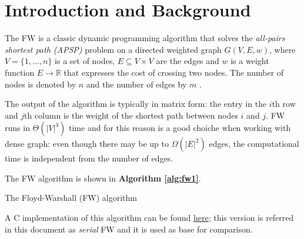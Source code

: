 \section{Introduction and Background}
The FW is a classic dynamic programming algorithm that solves the \emph{all-pairs shortest path (APSP)} problem on a directed weighted
graph $G(V, E, w)$, where $V = \{1, \dots, n\}$ is a set of nodes, $E \subseteq V \times V$ are the edges and $w$ is a weight function $E \rightarrow  \mathbb{R}$
that expresses the cost of crossing two nodes. The number of nodes is denoted by $n$ and the number of edges by $m$ . \par
The output of the algorithm is typically in matrix form: the entry in the $i$th row and $j$th column is the weight of the shortest path between
nodes $i$ and $j$. FW runs in $\Theta(|V|^3)$ time and for this reason is a good choiche when working with dense graph: even though there
may be up to $\Omega(|E|^2)$ edges, the computational time is independent from the number of edges. \par
The FW algorithm is shown in \textbf{Algorithm \ref*{alg:fw1}}.

\begin{algorithm}[h!]

\SetAlgoLined

 
\caption{The Floyd-Warshall (FW) algorithm}\label{alg:fw1}
\end{algorithm}



A C implementation of this algorithm can be found \href{https://github.com/firaja/Parallel-FloydWarshall/blob/master/sequential.c}{here};
this version is referred in this document as \emph{serial} FW and it is used as base for comparison. \par 

